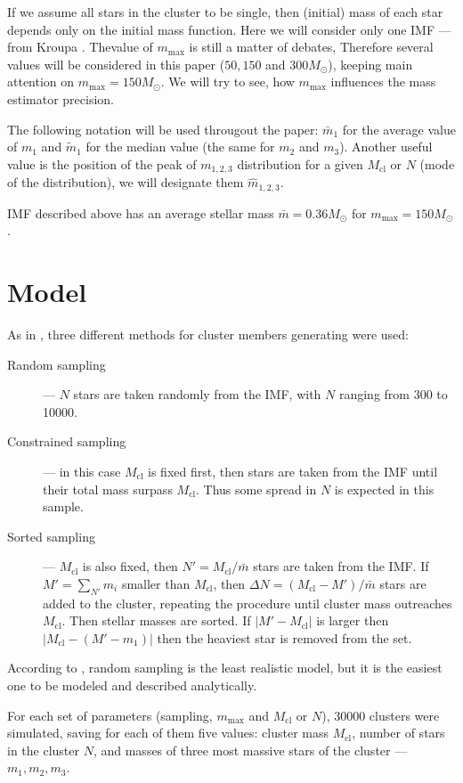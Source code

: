 \documentclass{aastex}
\newcommand{\MSun}{M_\odot}
\newcommand{\Mmax}{m_{\mathrm{max}}}
\newcommand{\Mcl}{M_{\mathrm{cl}}}
\begin{document}
If we assume all stars in the cluster to be single, then (initial) mass of each star depends only on 
the initial mass function. Here we will consider only one IMF --- from Kroupa \citet{Kroupa2001}. 
Thevalue of $\Mmax$ is still a matter of debates, Therefore several values will be considered in this paper ($50, 150$ and $300 \MSun$), keeping main attention on $\Mmax = 150 \MSun$.
We will try to see, how $\Mmax$ influences the mass estimator precision.

The following notation will be used througout the paper: $\bar{m}_1$ for the average value of $m_1$ and $\tilde{m}_1$ for the median value (the same for $m_2$ and $m_3$). Another useful value is  the position of the peak of $m_{1,2,3}$ distribution for a given $\Mcl$ or $N$ (mode of the distribution), we will designate them $\hat{m}_{1,2,3}$.

IMF described above has an average stellar mass $\bar{m} = 0.36 \MSun$ for $\Mmax = 150 \MSun$.

\section{Model}

As in \citep{Origin}, three different methods for cluster members generating were used:
\begin{description}
 \item[Random sampling] --- $N$ stars are taken randomly from the IMF, with $N$ ranging from 300 to 10000.
 \item[Constrained sampling] --- in this case $\Mcl$ is fixed first, then stars are taken from the IMF until their total mass surpass $\Mcl$. Thus some spread in $N$ is expected in this sample.
 \item[Sorted sampling] --- $\Mcl$ is also fixed, then $N' = \Mcl/\bar{m}$ stars are taken from the IMF. If $M' = \sum_{N'} m_i$ smaller than $\Mcl$, then $\Delta N = (\Mcl - M')/\bar{m}$ stars are added to the cluster, repeating the procedure until cluster mass outreaches $\Mcl$. Then stellar masses are sorted. If $|M' - \Mcl|$ is larger then $\left|\Mcl - (M'-m_{1})\right|$ then the heaviest star is removed from the set. 
\end{description}

According to \citep{Origin}, random sampling is the least realistic model, but it is the easiest one to be modeled and described analytically.

For each set of parameters (sampling, $\Mmax$ and $\Mcl$ or $N$), 30000 clusters were simulated, saving for each of them five values: cluster mass $\Mcl$,
number of stars in the cluster $N$, and masses of three most massive stars of the cluster --- $m_1, m_2, m_3$.
\end{document}
